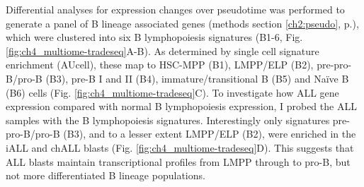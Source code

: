 Differential analyses for expression changes over pseudotime was performed to generate a panel of B lineage associated genes (methods section \ref{ch2:pseudo}, p.\pageref{ch2:pseudo}), which were clustered into six B lymphopoiesis signatures (B1-6, Fig. \ref{fig:ch4_multiome-tradeseq}A-B). As determined by single cell signature enrichment (AUcell), these map to HSC-MPP (B1), LMPP/ELP (B2), pre-pro-B/pro-B (B3), pre-B I and II (B4), immature/transitional B (B5) and Na\"{i}ve B (B6) cells (Fig. \ref{fig:ch4_multiome-tradeseq}C). To investigate how ALL gene expression compared with normal B lymphopoiesis expression, I probed the ALL samples with the B lymphopoiesis signatures. Interestingly only signatures pre-pro-B/pro-B (B3), and to a lesser extent LMPP/ELP (B2), were enriched in the iALL and chALL blasts (Fig. \ref{fig:ch4_multiome-tradeseq}D). This suggests that ALL blasts maintain transcriptional profiles from LMPP through to pro-B, but not more differentiated B lineage populations.

